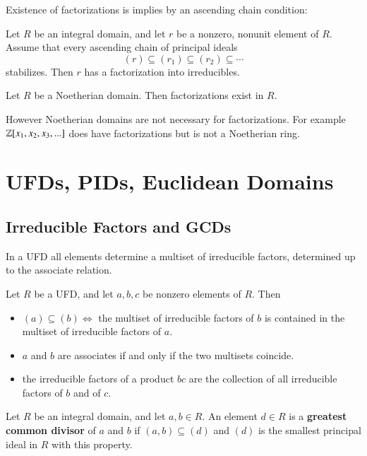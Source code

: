 \documentclass[12pt, a4paper, oneside, openright, titlepage]{book}
\begin{document}
Existence of factorizations is implies by an ascending chain condition:

\begin{prop}
    Let $R$ be an integral domain, and let $r$ be a nonzero, nonunit element of $R$. Assume that every ascending chain of principal ideals $$(r) \subseteq (r_1) \subseteq (r_2) \subseteq \cdots$$ 
    stabilizes. Then $r$ has a factorization into irreducibles.
\end{prop}

\begin{cor}
    Let $R$ be a Noetherian domain. Then factorizations exist in $R$.
\end{cor}

However Noetherian domains are not necessary for factorizations. For example $\mathbb Z[x_1,x_2,x_3,...]$ does have factorizations but is not a Noetherian ring.

\chapter{UFDs, PIDs, Euclidean Domains}


\section{Irreducible Factors and GCDs}

In a UFD all elements determine a multiset of irreducible factors, determined up to the associate relation.

\begin{lem}
    Let $R$ be a UFD, and let $a,b,c$ be nonzero elements of $R$. Then \begin{itemize}
        \item $(a) \subseteq (b) \iff$ the multiset of irreducible factors of $b$ is contained in the multiset of irreducible factors of $a$.
        \item $a$ and $b$ are associates if and only if the two multisets coincide.
        \item the irreducible factors of a product $bc$ are the collection of all irreducible factors of $b$ and of $c$.
    \end{itemize}
\end{lem}

\begin{defn}
    Let $R$ be an integral domain, and let $a,b \in R$. An element $d \in R$ is a \textbf{greatest common divisor} of $a$ and $b$ if $(a,b) \subseteq (d)$ and $(d)$ is the smallest principal ideal in $R$ with this property.
\end{defn}
\end{document}
